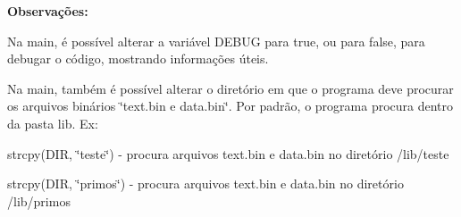 {\bfseries Observações\+:}


\begin{DoxyItemize}
\item Na main, é possível alterar a variável D\+E\+B\+UG para true, ou para false, para debugar o código, mostrando informações úteis.
\item Na main, também é possível alterar o diretório em que o programa deve procurar os arquivos binários \char`\"{}text.\+bin e data.\+bin\char`\"{}. Por padrão, o programa procura dentro da pasta lib. Ex\+:
\item strcpy(D\+IR, \char`\"{}teste\char`\"{}) -\/ procura arquivos text.\+bin e data.\+bin no diretório /lib/teste
\item strcpy(D\+IR, \char`\"{}primos\char`\"{}) -\/ procura arquivos text.\+bin e data.\+bin no diretório /lib/primos 
\end{DoxyItemize}